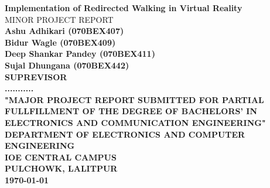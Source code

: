 \begin{titlepage}
\center
\Large \textbf{Implementation of Redirected Walking in Virtual Reality}\\[0.5cm]
\large MINOR PROJECT REPORT\\

\bfseries
Ashu Adhikari (070BEX407)\\
Bidur Wagle (070BEX409)\\
Deep Shankar Pandey (070BEX411)\\
Sujal Dhungana (070BEX442)\\[1cm]

\textsc{SUPREVISOR}\\
\textbf{...........} \\[1cm]

\textbf{"MAJOR PROJECT REPORT SUBMITTED FOR PARTIAL FULLFILLMENT OF THE DEGREE OF BACHELORS' IN ELECTRONICS AND COMMUNICATION ENGINEERING"}\\[0.5cm]
\textsc{DEPARTMENT OF ELECTRONICS AND COMPUTER ENGINEERING}\\[0.2cm]
\textbf{IOE CENTRAL CAMPUS}\\
\textbf{PULCHOWK, LALITPUR}\\[0.5cm]
\textbf{\large \today}
\end{titlepage}
